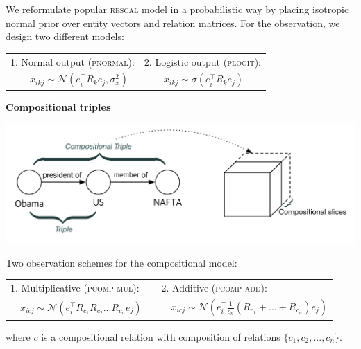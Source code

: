\documentclass[a0,landscape]{a0poster}
\begin{document}
\begin{multicols}{3}
We reformulate popular \textsc{rescal} model in a probabilistic way by placing isotropic normal prior over entity vectors and relation matrices. For the observation, we design two different models:

\begin{center}
\begin{tabular}{p{.5\linewidth}p{.45\linewidth}}
 1. Normal output (\textsc{pnormal}):&
 2. Logistic output (\textsc{plogit}):\\
 $\quad\quad x_{ikj} \sim \mathcal{N}(e_i^\top R_k e_j, \sigma_x^2)$
&
 $\quad\quad x_{ikj} \sim \sigma(e_i^\top R_k e_j)$
\end{tabular}
\end{center}


\begin{center}
\noindent\textbf{Compositional triples}
\vspace{.5cm}

\includegraphics[width=.9\linewidth]{./figures/composition.pdf}
\end{center}

\noindent Two observation schemes for the compositional model:

\begin{center}
\begin{tabular}{l l}
1. Multiplicative {\small(\textsc{pcomp-mul})}:
&
$\quad$2. Additive {\small(\textsc{pcomp-add})}:\\
$\quad x_{icj} \sim \mathcal{N}(e_i^\top R_{c_1} R_{c_2} \dots R_{c_n} e_j)$
&
$\quad\quad x_{icj} \sim \mathcal{N}(e_i^\top \frac{1}{c_n} (R_{c_1} + \dots + R_{c_n}) e_j)$
\end{tabular}
\end{center}
where $c$ is a compositional relation with composition of relations $\{c_1, c_2, ..., c_n\}$.


\end{multicols}
\end{document}
